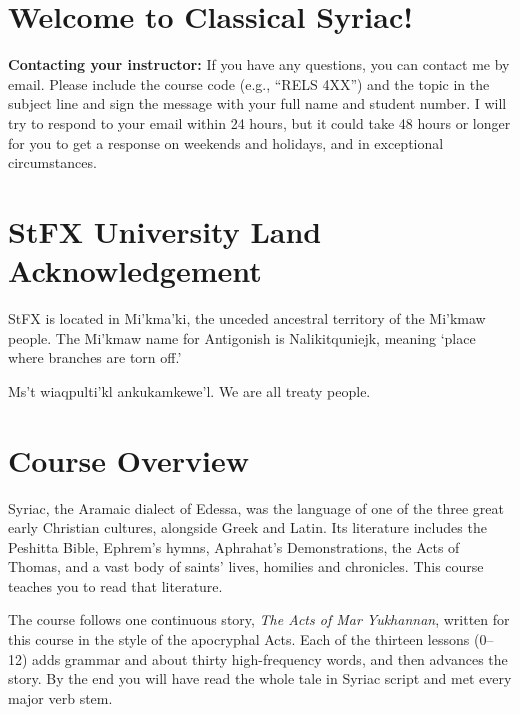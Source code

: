 \documentclass[12pt]{article}
\begin{document}

\section*{Welcome to Classical Syriac!}


\textbf{Contacting your instructor:} If you have any questions, you can contact me by email. Please include the course code (e.g., ``RELS 4XX'') and the topic in the subject line and sign the message with your full name and student number. I will try to respond to your email within 24 hours, but it could take 48 hours or longer for you to get a response on weekends and holidays, and in exceptional circumstances.

\section*{StFX University Land Acknowledgement}

StFX is located in Mi’kma’ki, the unceded ancestral territory of the Mi'kmaw people. The Mi'kmaw name for Antigonish is Nalikitquniejk, meaning ‘place where branches are torn off.’

Ms't wiaqpulti'kl ankukamkewe'l. We are all treaty people.

\section*{Course Overview}

Syriac, the Aramaic dialect of Edessa, was the language of one of the three great early Christian cultures, alongside Greek and Latin. Its literature includes the Peshitta Bible, Ephrem's hymns, Aphrahat's Demonstrations, the Acts of Thomas, and a vast body of saints' lives, homilies and chronicles. This course teaches you to read that literature.

The course follows one continuous story, \emph{The Acts of Mar Yukhannan}, written for this course in the style of the apocryphal Acts. Each of the thirteen lessons (0--12) adds grammar and about thirty high-frequency words, and then advances the story. By the end you will have read the whole tale in Syriac script and met every major verb stem.
\end{document}
